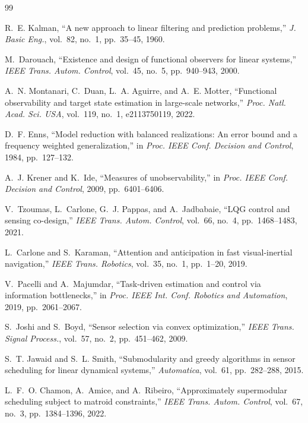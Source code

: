 \documentclass[letterpaper,onecolumn]{IEEEtran}
\theoremstyle{definition}
\theoremstyle{remark}
\begin{document}
\begin{thebibliography}{99}\footnotesize

 R.~E. Kalman, ``A new approach to linear filtering and
prediction problems,'' \emph{J. Basic Eng.}, vol.~82, no.~1, pp.~35--45, 1960.

 M.~Darouach, ``Existence and design of functional
observers for linear systems,'' \emph{IEEE Trans. Autom. Control}, vol.~45,
no.~5, pp.~940--943, 2000.

 A.~N. Montanari, C.~Duan, L.~A. Aguirre, and A.~E.
Motter, ``Functional observability and target state estimation in large-scale
networks,'' \emph{Proc. Natl. Acad. Sci. USA}, vol.~119, no.~1, e2113750119,
2022.

 D.~F. Enns, ``Model reduction with balanced realizations:
An error bound and a frequency weighted generalization,'' in \emph{Proc. IEEE
Conf. Decision and Control}, 1984, pp.~127--132.

 A.~J. Krener and K.~Ide, ``Measures of
unobservability,'' in \emph{Proc. IEEE Conf. Decision and Control}, 2009,
pp.~6401--6406.

 V.~Tzoumas, L.~Carlone, G.~J. Pappas, and
A.~Jadbabaie, ``LQG control and sensing co-design,'' \emph{IEEE Trans.
Autom. Control}, vol.~66, no.~4, pp.~1468--1483, 2021.

 L.~Carlone and S.~Karaman, ``Attention and anticipation
in fast visual-inertial navigation,'' \emph{IEEE Trans. Robotics}, vol.~35,
no.~1, pp.~1--20, 2019.

 V.~Pacelli and A.~Majumdar, ``Task-driven estimation and
control via information bottlenecks,'' in \emph{Proc. IEEE Int. Conf.
Robotics and Automation}, 2019, pp.~2061--2067.

 S.~Joshi and S.~Boyd, ``Sensor selection via convex
optimization,'' \emph{IEEE Trans. Signal Process.}, vol.~57, no.~2,
pp.~451--462, 2009.

 S.~T. Jawaid and S.~L. Smith, ``Submodularity and
greedy algorithms in sensor scheduling for linear dynamical systems,''
\emph{Automatica}, vol.~61, pp.~282--288, 2015.

 L.~F.~O. Chamon, A.~Amice, and A.~Ribeiro,
``Approximately supermodular scheduling subject to matroid constraints,''
\emph{IEEE Trans. Autom. Control}, vol.~67, no.~3, pp.~1384--1396, 2022.


\end{thebibliography}
\end{document}
